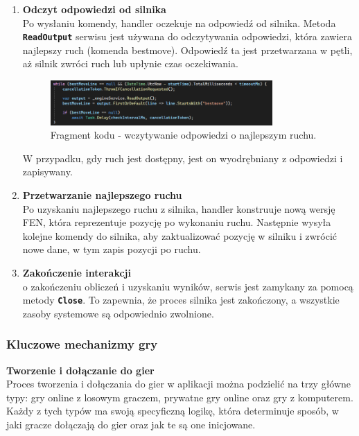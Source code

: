 \documentclass[12pt,a4paper]{article}
\begin{document}
\begin{enumerate}
    \item \textbf{Odczyt odpowiedzi od silnika}\\
    Po wysłaniu komendy, handler oczekuje na odpowiedź od silnika. Metoda \texttt{\textbf{ReadOutput}} serwisu jest używana do odczytywania odpowiedzi, która zawiera najlepszy ruch (komenda bestmove). Odpowiedź ta jest przetwarzana w pętli, aż silnik zwróci ruch lub upłynie czas oczekiwania.
    
    \begin{figure}[h!]
        \centering
        \includegraphics[width=0.8\textwidth]{images/ex_read_output.png}
        \caption{Fragment kodu - wczytywanie odpowiedzi o najlepszym ruchu.}
    \end{figure}

    W przypadku, gdy ruch jest dostępny, jest on wyodrębniany z odpowiedzi i zapisywany.

    \item \textbf{Przetwarzanie najlepszego ruchu}\\
    Po uzyskaniu najlepszego ruchu z silnika, handler konstruuje nową wersję FEN, która reprezentuje pozycję po wykonaniu ruchu. Następnie wysyła kolejne komendy do silnika, aby zaktualizować pozycję w silniku i zwrócić nowe dane, w tym zapis pozycji po ruchu.

    \item \textbf{Zakończenie interakcji}\\
    o zakończeniu obliczeń i uzyskaniu wyników, serwis jest zamykany za pomocą metody \texttt{\textbf{Close}}. To zapewnia, że proces silnika jest zakończony, a wszystkie zasoby systemowe są odpowiednio zwolnione.
\end{enumerate}

\newpage
\subsubsection{Kluczowe mechanizmy gry}

\noindent \textbf{Tworzenie i dołączanie do gier}\\
Proces tworzenia i dołączania do gier w aplikacji można podzielić na trzy główne typy: gry online z losowym graczem, prywatne gry online oraz gry z komputerem. Każdy z tych typów ma swoją specyficzną logikę, która determinuje sposób, w jaki gracze dołączają do gier oraz jak te są one inicjowane.
\end{document}
